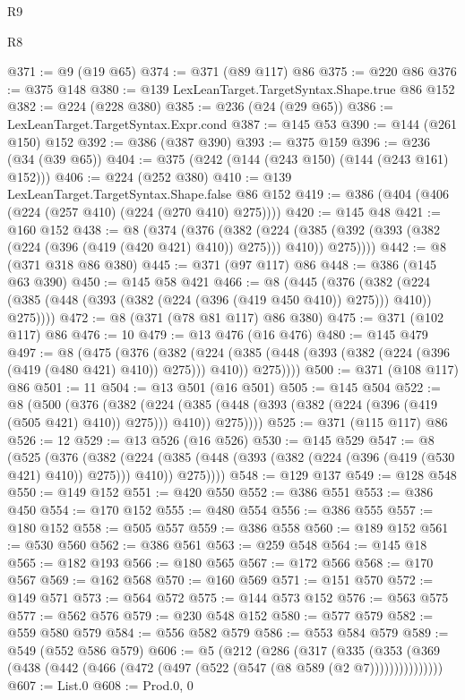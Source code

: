 \begin{lexlean}{R9}
\begin{lexlean}{R8}
\begin{coremodule}
{{{{{{{{{{{{{{{{{{{{{{{{{{{{{{{{{{{{{{{{@371 := @9 (@19 @65)
@374 := @371 (@89 @117) @86
@375 := @220 @86
@376 := @375 @148
@380 := @139 LexLeanTarget.TargetSyntax.Shape.true @86 @152
@382 := @224 (@228 @380)
@385 := @236 (@24 (@29 @65))
@386 := LexLeanTarget.TargetSyntax.Expr.cond
@387 := @145 @53
@390 := @144 (@261 @150) @152
@392 := @386 (@387 @390)
@393 := @375 @159
@396 := @236 (@34 (@39 @65))
@404 := @375 (@242 (@144 (@243 @150) (@144 (@243 @161) @152)))
@406 := @224 (@252 @380)
@410 := @139 LexLeanTarget.TargetSyntax.Shape.false @86 @152
@419 := @386 (@404 (@406 (@224 (@257 @410) (@224 (@270 @410) @275))))
@420 := @145 @48
@421 := @160 @152
@438 := @8
    (@374
      (@376
        (@382
          (@224 (@385 (@392 (@393 (@382 (@224 (@396 (@419 (@420 @421) @410)) @275))) @410)) @275))))
@442 := @8 (@371 @318 @86 @380)
@445 := @371 (@97 @117) @86
@448 := @386 (@145 @63 @390)
@450 := @145 @58 @421
@466 := @8
    (@445
      (@376
        (@382 (@224 (@385 (@448 (@393 (@382 (@224 (@396 (@419 @450 @410)) @275))) @410)) @275))))
@472 := @8 (@371 (@78 @81 @117) @86 @380)
@475 := @371 (@102 @117) @86
@476 := 10
@479 := @13 @476 (@16 @476)
@480 := @145 @479
@497 := @8
    (@475
      (@376
        (@382
          (@224 (@385 (@448 (@393 (@382 (@224 (@396 (@419 (@480 @421) @410)) @275))) @410)) @275))))
@500 := @371 (@108 @117) @86
@501 := 11
@504 := @13 @501 (@16 @501)
@505 := @145 @504
@522 := @8
    (@500
      (@376
        (@382
          (@224 (@385 (@448 (@393 (@382 (@224 (@396 (@419 (@505 @421) @410)) @275))) @410)) @275))))
@525 := @371 (@115 @117) @86
@526 := 12
@529 := @13 @526 (@16 @526)
@530 := @145 @529
@547 := @8
    (@525
      (@376
        (@382
          (@224 (@385 (@448 (@393 (@382 (@224 (@396 (@419 (@530 @421) @410)) @275))) @410)) @275))))
@548 := @129 @137
@549 := @128 @548
@550 := @149 @152
@551 := @420 @550
@552 := @386 @551
@553 := @386 @450
@554 := @170 @152
@555 := @480 @554
@556 := @386 @555
@557 := @180 @152
@558 := @505 @557
@559 := @386 @558
@560 := @189 @152
@561 := @530 @560
@562 := @386 @561
@563 := @259 @548
@564 := @145 @18
@565 := @182 @193
@566 := @180 @565
@567 := @172 @566
@568 := @170 @567
@569 := @162 @568
@570 := @160 @569
@571 := @151 @570
@572 := @149 @571
@573 := @564 @572
@575 := @144 @573 @152
@576 := @563 @575
@577 := @562 @576
@579 := @230 @548 @152
@580 := @577 @579
@582 := @559 @580 @579
@584 := @556 @582 @579
@586 := @553 @584 @579
@589 := @549 (@552 @586 @579)
@606 := @5
    (@212
      (@286
        (@317
          (@335 (@353 (@369 (@438 (@442 (@466 (@472 (@497 (@522 (@547 (@8 @589 (@2 @7)))))))))))))))
@607 := List.{0}
@608 := Prod.{0, 0}
}}}}}}}}}}}}}}}}}}}}}}}}}}}}}}}}}}}}}}}}
\end{coremodule}
\end{lexlean}
\end{lexlean}
